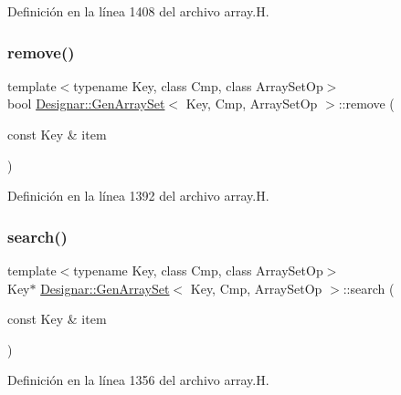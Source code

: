 Definición en la línea 1408 del archivo array.\+H.

\mbox{\label{class_designar_1_1_gen_array_set_acddff41221307179e0b4c20afbcfe253}} 
\subsubsection{\texorpdfstring{remove()}{remove()}}
{\footnotesize\ttfamily template$<$typename Key, class Cmp, class Array\+Set\+Op$>$ \\
bool \hyperlink{class_designar_1_1_gen_array_set}{Designar\+::\+Gen\+Array\+Set}$<$ Key, Cmp, Array\+Set\+Op $>$\+::remove (\begin{DoxyParamCaption}\item[{const Key \&}]{item }\end{DoxyParamCaption})\hspace{0.3cm}{\ttfamily [inline]}}



Definición en la línea 1392 del archivo array.\+H.

\mbox{\label{class_designar_1_1_gen_array_set_ab6e8baee6087d491045de115ed7fb48e}} 
\subsubsection{\texorpdfstring{search()}{search()}\hspace{0.1cm}{\footnotesize\ttfamily [1/2]}}
{\footnotesize\ttfamily template$<$typename Key, class Cmp, class Array\+Set\+Op$>$ \\
Key$\ast$ \hyperlink{class_designar_1_1_gen_array_set}{Designar\+::\+Gen\+Array\+Set}$<$ Key, Cmp, Array\+Set\+Op $>$\+::search (\begin{DoxyParamCaption}\item[{const Key \&}]{item }\end{DoxyParamCaption})\hspace{0.3cm}{\ttfamily [inline]}}



Definición en la línea 1356 del archivo array.\+H.

